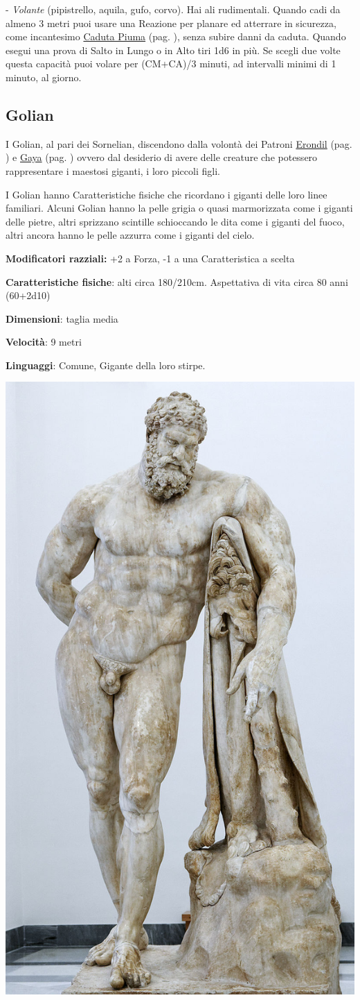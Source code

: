 \begin{multicols}{2}
- \emph{Volante} (pipistrello, aquila, gufo, corvo). Hai ali rudimentali. Quando cadi da almeno 3 metri puoi usare una Reazione per planare ed atterrare in sicurezza, come incantesimo \hyperlink{cadutapiuma}{Caduta Piuma} (pag. \pageref{cadutapiuma}), senza subire danni da caduta. Quando esegui una prova di Salto in Lungo o in Alto tiri 1d6 in più. Se scegli due volte questa capacità puoi volare per (CM+CA)/3 minuti, ad intervalli minimi di 1 minuto, al giorno.

\subsection{Golian}\label{golian}\hypertarget{golian}{}

I Golian, al pari dei Sornelian, discendono dalla volontà dei Patroni \hyperlink{erondil}{Erondil} (pag. \pageref{erondil}) e \hyperlink{gaya}{Gaya} (pag. \pageref{gaya}) ovvero dal desiderio di avere delle creature che potessero rappresentare i maestosi giganti, i loro piccoli figli.

I Golian hanno Caratteristiche fisiche che ricordano i giganti delle loro linee familiari. Alcuni Golian hanno la pelle grigia o quasi marmorizzata come i giganti delle pietre, altri sprizzano scintille schioccando le dita come i giganti del fuoco, altri ancora hanno le pelle azzurra come i giganti del cielo.

\textbf{Modificatori razziali:} +2 a Forza, -1 a una Caratteristica a scelta

\textbf{Caratteristiche fisiche}: alti circa 180/210cm. Aspettativa di vita circa 80 anni (60+2d10)

\textbf{Dimensioni}: taglia media

\textbf{Velocità}: 9 metri

\textbf{Linguaggi}: Comune, Gigante della loro stirpe.

\begin{center}
	\includegraphics[height=0.8\linewidth]{immagini/Herakles_Farnese_MAN_Napoli_Inv6001_n01.png}


\end{center}
\end{multicols}
